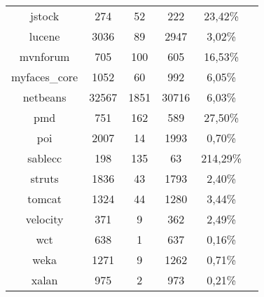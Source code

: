 \begin{table}
\begin{tabularx}{\textwidth}{c|c|c|c|c|c}
		jstock & 274 & 52 & 222 & 23,42\%  & \\
		lucene & 3036 & 89 & 2947 & 3,02\%  & \\
		mvnforum & 705 & 100 & 605 & 16,53\%  & \\
		myfaces\_core & 1052 & 60 & 992 & 6,05\%  & \\
		netbeans & 32567 & 1851 & 30716 & 6,03\%  & \\
		pmd & 751 & 162 & 589 & 27,50\%  & \\
		poi & 2007 & 14 & 1993 & 0,70\%  & \\
		sablecc & 198 & 135 & 63 & 214,29\%  & \\
		struts & 1836 & 43 & 1793 & 2,40\%  & \\
		tomcat & 1324 & 44 & 1280 & 3,44\%  & \\
		velocity & 371 & 9 & 362 & 2,49\%  & \\
		wct & 638 & 1 & 637 & 0,16\%  & \\
		weka & 1271 & 9 & 1262 & 0,71\%  & \\
		xalan & 975 & 2 & 973 & 0,21\%  & 		
	\end{tabularx}
\end{table}
\setlength{\extrarowheight}{0em}
